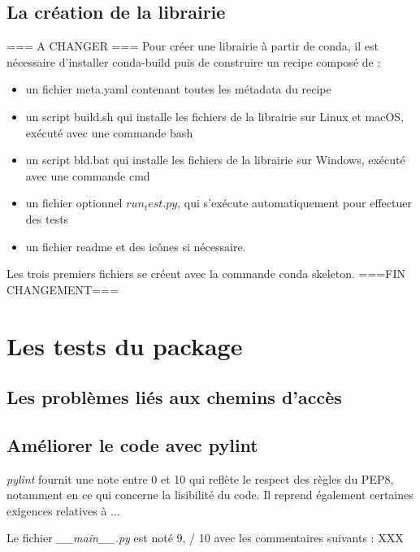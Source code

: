\documentclass[twoside,a4paper,11pt,frenchb,openany]{report}
\begin{document}

\section{La création de la librairie}

=== A CHANGER ===
Pour créer une librairie à partir de conda, il est nécessaire d'installer conda-build puis de construire un recipe composé de :
\begin{itemize}
\item un fichier meta.yaml contenant toutes les métadata du recipe
\item un script build.sh qui installe les fichiers de la librairie sur Linux et macOS, exécuté avec une commande bash
\item un script bld.bat qui installe les fichiers de la librairie sur Windows, exécuté avec une commande cmd
\item un fichier optionnel $run_test.py$, qui s'exécute automatiquement pour effectuer des tests
\item un fichier readme et des icônes si nécessaire.  
\end{itemize}
Les trois premiers fichiers se créent avec la commande conda skeleton.
===FIN CHANGEMENT===



\chapter{Les tests du package}


\section{Les problèmes liés aux chemins d'accès}




\section{Améliorer le code avec pylint}

\textit{pylint} fournit une note entre 0 et 10 qui reflète le respect des règles du PEP8, notamment en ce qui concerne la lisibilité du code. Il reprend également certaines exigences relatives à ...

Le fichier \textit{\_\_main\_\_.py} est noté 9, / 10 avec les commentaires suivants :
XXX
\end{document}
